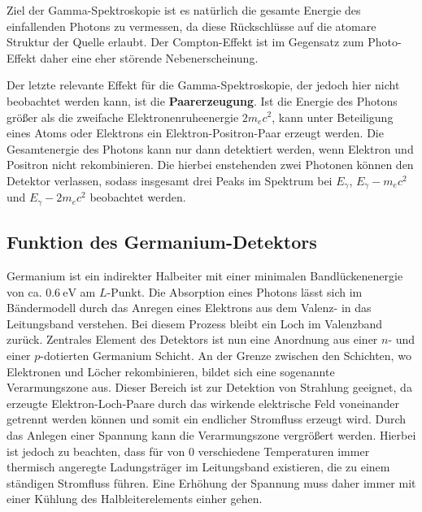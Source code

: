 Ziel der Gamma-Spektroskopie ist es natürlich die 
gesamte Energie des einfallenden Photons zu vermessen, da diese Rückschlüsse auf die atomare Struktur der Quelle 
erlaubt. Der Compton-Effekt ist im Gegensatz zum Photo-Effekt daher eine eher störende Nebenerscheinung.

Der letzte relevante Effekt für die Gamma-Spektroskopie, der jedoch hier nicht beobachtet werden kann, ist die 
\textbf{Paarerzeugung}. Ist die Energie des Photons größer als die zweifache Elektronenruheenergie $2m_ec^2$, 
kann unter Beteiligung eines Atoms oder Elektrons ein Elektron-Positron-Paar erzeugt werden. Die Gesamtenergie 
des Photons kann nur dann detektiert werden, wenn Elektron und Positron nicht rekombinieren. Die hierbei enstehenden 
zwei Photonen können den Detektor verlassen, sodass insgesamt drei Peaks im Spektrum bei $E_\gamma$, $E_\gamma - m_ec^2$ und 
$E_\gamma - 2m_ec^2$ beobachtet werden. 

\subsection{Funktion des Germanium-Detektors}
Germanium ist ein indirekter Halbeiter mit einer minimalen Bandlückenenergie von ca. $\SI{0.6}{\electronvolt}$ am $L$-Punkt. 
Die Absorption eines Photons lässt sich im Bändermodell durch das Anregen eines Elektrons aus dem Valenz- in das 
Leitungsband verstehen. Bei diesem Prozess bleibt ein Loch im Valenzband zurück. Zentrales Element des Detektors ist nun 
eine Anordnung aus einer $n$- und einer $p$-dotierten Germanium Schicht. An der Grenze zwischen den Schichten, wo Elektronen 
und Löcher rekombinieren, bildet sich eine sogenannte Verarmungszone aus. Dieser Bereich ist zur Detektion von Strahlung 
geeignet, da erzeugte Elektron-Loch-Paare durch das wirkende elektrische Feld voneinander getrennt werden können und somit ein 
endlicher Stromfluss erzeugt wird. Durch das Anlegen einer Spannung kann die Verarmungszone vergrößert werden. Hierbei ist jedoch 
zu beachten, dass für von $0$ verschiedene Temperaturen immer thermisch angeregte Ladungsträger im Leitungsband existieren, die 
zu einem ständigen Stromfluss führen. Eine Erhöhung der Spannung muss daher immer mit einer Kühlung des 
Halbleiterelements einher gehen.

